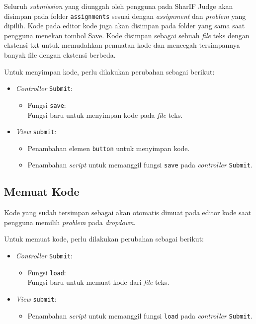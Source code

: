 Seluruh \textit{submission} yang diunggah oleh pengguna pada SharIF Judge akan disimpan pada folder \verb|assignments| sesuai dengan \textit{assignment} dan \textit{problem} yang dipilih. Kode pada editor kode juga akan disimpan pada folder yang sama saat pengguna menekan tombol Save. Kode disimpan sebagai sebuah \textit{file} teks dengan ekstensi txt untuk memudahkan pemuatan kode dan mencegah tersimpannya banyak file dengan ekstensi berbeda.

Untuk menyimpan kode, perlu dilakukan perubahan sebagai berikut:
\begin{itemize}
	\item \textit{Controller} \verb|Submit|:
    \begin{itemize}
		\item Fungsi \verb|save|: \\ Fungsi baru untuk menyimpan kode pada \textit{file} teks.
    \end{itemize}
    \item \textit{View} \verb|submit|:
    \begin{itemize}
        \item Penambahan elemen \verb|button| untuk menyimpan kode.
        \item Penambahan \textit{script} untuk memanggil fungsi \verb|save| pada \textit{controller} \verb|Submit|. 
    \end{itemize}
\end{itemize}

\subsection{Memuat Kode}
\label{subsec:4:muat}

Kode yang sudah tersimpan sebagai akan otomatis dimuat pada editor kode saat pengguna memilih \textit{problem} pada \textit{dropdown}.

Untuk memuat kode, perlu dilakukan perubahan sebagai berikut:
\begin{itemize}
	\item \textit{Controller} \verb|Submit|:
    \begin{itemize}
		\item Fungsi \verb|load|: \\ Fungsi baru untuk memuat kode dari \textit{file} teks.
    \end{itemize}
    \item \textit{View} \verb|submit|:
    \begin{itemize}
        \item Penambahan \textit{script} untuk memanggil fungsi \verb|load| pada \textit{controller} \verb|Submit|. 
    \end{itemize}
\end{itemize}

